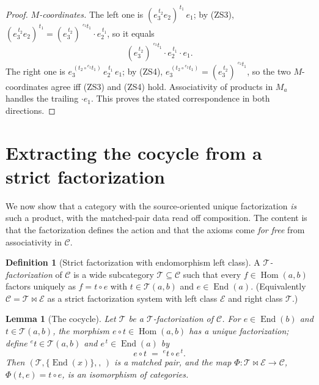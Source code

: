 \documentclass[11pt]{article}
\newtheorem{lemma}[theorem]{Lemma}
\theoremstyle{definition}
\newtheorem{definition}[theorem]{Definition}
\newcommand{\Hom}{\operatorname{Hom}}
\newcommand{\End}{\operatorname{End}}
\newcommand{\C}{\mathcal{C}}
\newcommand{\T}{\mathcal{T}}
\newcommand{\E}{\mathcal{E}}
\newcommand{\lact}[2]{{}^{#1}\!#2}      %
\newcommand{\rest}[2]{#1^{\,#2}}        %
\begin{document}
\begin{proof}
\emph{$M$-coordinates.} The left one is $\rest{(\rest{e_3}{t_2}e_2)}{t_1}\,e_1$;
by (ZS3), $\rest{(\rest{e_3}{t_2}e_2)}{t_1}
=\rest{(\rest{e_3}{t_2})}{\,\lact{e_2}{t_1}}\cdot\rest{e_2}{t_1}$, so it equals
\[
  \rest{(\rest{e_3}{t_2})}{\,\lact{e_2}{t_1}}\cdot\rest{e_2}{t_1}\cdot e_1 .
\]
The right one is $\rest{e_3}{(t_2\circ\lact{e_2}{t_1})}\,\rest{e_2}{t_1}\,e_1$;
by (ZS4), $\rest{e_3}{(t_2\circ\lact{e_2}{t_1})}
=\rest{(\rest{e_3}{t_2})}{\,\lact{e_2}{t_1}}$, so the two $M$-coordinates agree
iff (ZS3) and (ZS4) hold. Associativity of products in $M_a$ handles the trailing
$\cdot e_1$. This proves the stated correspondence in both directions.
\end{proof}

\section{Extracting the cocycle from a strict factorization}

We now show that a category with the source-oriented unique factorization
\emph{is} such a product, with the matched-pair data read off composition. The
content is that the factorization defines the action and that the axioms come
\emph{for free} from associativity in $\C$.

\begin{definition}[Strict factorization with endomorphism left class]\label{def:strict}
A \emph{$\T$-factorization} of $\C$ is a wide subcategory $\T\subseteq\C$ such
that every $f\in\Hom(a,b)$ factors uniquely as $f=t\circ e$ with $t\in\T(a,b)$
and $e\in\End(a)$. (Equivalently $\C=\T\bowtie\E$ as a strict factorization
system with left class $\E$ and right class $\T$.)
\end{definition}

\begin{lemma}[The cocycle]\label{lem:cocycle}
Let $\T$ be a $\T$-factorization of $\C$. For $e\in\End(b)$ and $t\in\T(a,b)$,
the morphism $e\circ t\in\Hom(a,b)$ has a unique factorization; define
$\lact{e}{t}\in\T(a,b)$ and $\rest{e}{t}\in\End(a)$ by
\begin{equation}\label{eq:star}
  e\circ t \;=\; \lact{e}{t}\circ\rest{e}{t}. \tag{$\star$}
\end{equation}
Then $(\T,\{\End(x)\},\lact{}{},\rest{}{})$ is a matched pair, and the map
$\Phi:\T\bowtie\E\to\C$, $\Phi(t,e)=t\circ e$, is an isomorphism of categories.
\end{lemma}
\end{document}
